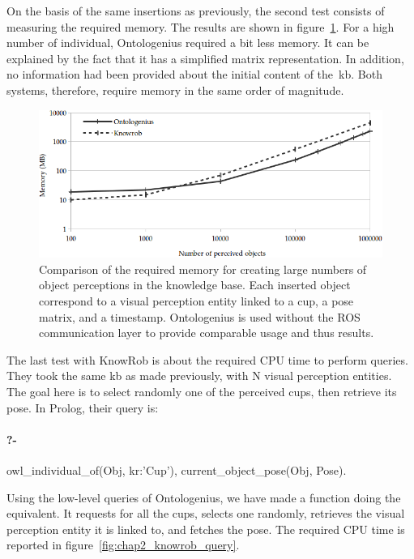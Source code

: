 On the basis of the same insertions as previously, the second test consists of measuring the required memory. The results are shown in figure~\ref{fig:chap2_knowrob_memory}. For a high number of individual, Ontologenius required a bit less memory. It can be explained by the fact that it has a simplified matrix representation. In addition, no information had been provided about the initial content of the~\acrshort{kb}. Both systems, therefore, require memory in the same order of magnitude.

\begin{figure}[ht!]
\centering
\includegraphics[width=\textwidth]{figures/chapter2/knowrob/Memory.png}
\caption{\label{fig:chap2_knowrob_memory} Comparison of the required memory for creating large numbers of object perceptions in the knowledge base. Each inserted object correspond to a visual perception entity linked to a cup, a pose matrix, and a timestamp. Ontologenius is used without the ROS communication layer to provide comparable usage and thus results.}
\end{figure}

The last test with KnowRob is about the required CPU time to perform queries. They took the same \acrshort{kb} as made previously, with N visual perception entities. The goal here is to select randomly one of the perceived cups, then retrieve its pose. In Prolog, their query is:

\paragraph{?-} owl\_individual\_of(Obj, kr:’Cup’), current\_object\_pose(Obj, Pose).

Using the low-level queries of Ontologenius, we have made a function doing the equivalent. It requests for all the cups, selects one randomly, retrieves the visual perception entity it is linked to, and fetches the pose. The required CPU time is reported in figure~\ref{fig:chap2_knowrob_query}.

